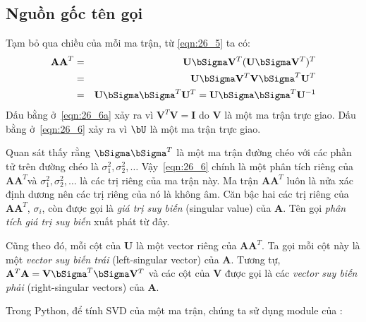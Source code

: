 \subsection{Nguồn gốc tên gọi}
Tạm bỏ qua chiều của mỗi ma trận, từ \eqref{eqn:26_5} ta có:  
\begin{eqnarray} 
\mathbf{AA}^T &=& \mathbf{U}\mathbf{\bSigma} \mathbf{V}^T (\mathbf{U}\mathbf{\bSigma} \mathbf{V}^T)^T \\\ 
\label{eqn:26_6a}
&=& \mathbf{U}\mathbf{\bSigma} \mathbf{V}^T \mathbf{V}\mathbf{\bSigma}^T\mathbf{U}^T \\\ 
\label{eqn:26_6}
&=& \mathbf{U}\mathbf{\bSigma}\mathbf{\bSigma}^T\mathbf{U}^T =  \mathbf{U}\mathbf{\bSigma}\mathbf{\bSigma}^T\mathbf{U}^{-1} 
\end{eqnarray} 
Dấu bằng ở~\eqref{eqn:26_6a} xảy ra vì $\mathbf{V}^T\mathbf{V} = \mathbf{I}$ do
$\mathbf{V}$ là một ma trận trực giao. Dấu bằng ở~\eqref{eqn:26_6} xảy ra vì
$\bU$ là một ma trận trực giao. 


Quan sát thấy rằng $\bSigma\bSigma^T$ là một ma trận đường chéo với các phần tử
trên đường chéo là $\sigma_1^2, \sigma_2^2, \dots$ Vậy~\eqref{eqn:26_6} chính
là một phân tích riêng của $\mathbf{A}\mathbf{A}^T$và $\sigma_1^2,
\sigma_2^2, \dots$ là các trị riêng của ma trận này.
 Ma trận $\mathbf{A}\mathbf{A}^T$ luôn là nửa xác định dương nên các trị
riêng của nó là không âm. Căn bậc hai các trị riêng của
$\mathbf{A}\mathbf{A}^T$, $\sigma_i$, còn được gọi là \textit{giá trị suy biến} (singular value) của
$\mathbf{A}$. Tên gọi \textit{phân tích giá trị suy biến} xuất phát từ đây.
 
Cũng theo đó, mỗi cột của $\mathbf{U}$ là một vector riêng của
$\mathbf{A}\mathbf{A}^T$. Ta gọi mỗi cột này là một \textit{vector suy biến trái} (left-singular
vector) của $\mathbf{A}$. Tương tự, $\mathbf{A}^T\mathbf{A} =
\mathbf{V}\bSigma^T\bSigma \mathbf{V}^T$ và các cột của $\mathbf{V}$ được
gọi là các \textit{vector suy biến phải} ({right-singular vectors}) của $\mathbf{A}$. 
 
Trong Python, để tính SVD của một ma trận, chúng ta sử dụng module
 của :
 
